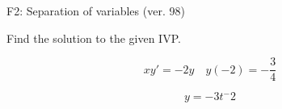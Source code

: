 \begin{exercise}
  \begin{exerciseTitle}F2: Separation of variables (ver. 98)\end{exerciseTitle}
  \begin{exerciseStatement}
    
Find the solution to the given IVP.

    
\[xy'= -2 y \hspace{1em} y( -2 ) = -\frac{3}{4}\]

  \end{exerciseStatement}
  \begin{exerciseAnswer}
    
\[y= -3 t^ -2\]

  \end{exerciseAnswer}
\end{exercise}
